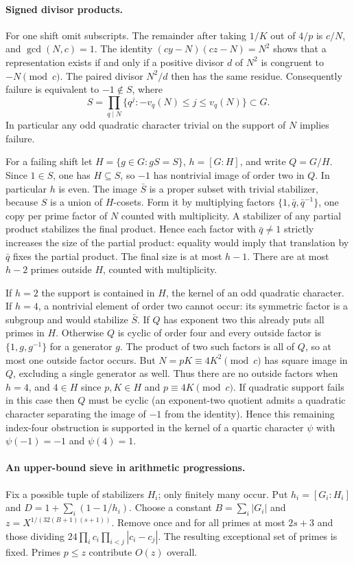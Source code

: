 \documentclass[a4paper,11pt]{article}
\theoremstyle{definition}\newtheorem{question}[theorem]{Question}
\begin{document}
\paragraph{Signed divisor products.}
For one shift omit subscripts. The remainder after taking $1/K$ out
of $4/p$ is $c/N$, and $\gcd(N,c)=1$.
The identity $(cy-N)(cz-N)=N^2$ shows that a representation exists
if and only if a positive divisor $d$ of $N^2$ is congruent to
$-N\pmod c$. The paired divisor $N^2/d$ then has the same residue.
Consequently failure is equivalent to $-1\notin S$, where
\[
 S=\prod_{q\mid N}\{q^j:-v_q(N)\le j\le v_q(N)\}\subset G.
\]
In particular any odd quadratic character trivial on the support of
$N$ implies failure.

For a failing shift let $H=\{g\in G:gS=S\}$, $h=[G:H]$, and
write $Q=G/H$. Since $1\in S$, one has $H\subseteq S$, so $-1$
has nontrivial image of order two in $Q$. In particular $h$ is even.
The image $\bar S$ is a proper subset with trivial stabilizer, because
$S$ is a union of $H$-cosets. Form it by multiplying factors
$\{1,\bar q,\bar q^{-1}\}$, one copy per prime factor of $N$ counted
with multiplicity. A stabilizer of any partial product stabilizes the
final product. Hence each factor with $\bar q\ne1$ strictly increases
the size of the partial product: equality would imply that translation
by $\bar q$ fixes the partial product. The final size is at most $h-1$.
There are at most $h-2$ primes outside $H$, counted with multiplicity.

If $h=2$ the support is contained in $H$, the kernel of an odd quadratic
character. If $h=4$, a nontrivial element of order two cannot occur:
its symmetric factor is a subgroup and would stabilize $\bar S$.
If $Q$ has exponent two this already puts all primes in $H$. Otherwise
$Q$ is cyclic of order four and every outside factor is
$\{1,g,g^{-1}\}$ for a generator $g$. The product of two such
factors is all of $Q$, so at most one outside factor occurs.
But $N=pK\equiv4K^2\pmod c$ has square image in $Q$, excluding
a single generator as well. Thus there are no outside factors when
$h=4$, and $4\in H$ since $p,K\in H$ and $p\equiv4K\pmod c$.
If quadratic support fails in this case then $Q$ must be cyclic
(an exponent-two quotient admits a quadratic character separating
the image of $-1$ from the identity). Hence this remaining
index-four obstruction is supported in the kernel of a quartic
character $\psi$ with $\psi(-1)=-1$ and $\psi(4)=1$.

\paragraph{An upper-bound sieve in arithmetic progressions.}
Fix a possible tuple of stabilizers $H_i$; only finitely many occur.
Put $h_i=[G_i:H_i]$ and
$D=1+\sum_i(1-1/h_i)$. Choose a constant $B=\sum_i|G_i|$ and
$z=X^{1/(32(B+1)(s+1))}$. Remove once and for all primes at most
$2s+3$ and those dividing
$24\prod_i c_i\prod_{i<j}|c_i-c_j|$. The resulting exceptional
set of primes is fixed. Primes $p\le z$ contribute $O(z)$ overall.
\end{document}
